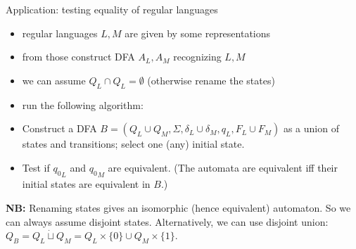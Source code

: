 \documentclass[handout]{beamer}
\begin{document}
\begin{frame}{Application: testing equality of regular languages}

    \begin{itemize}
        \item regular languages $L,M$ are given by some representations
        \item from those construct DFA $A_L,A_M$ recognizing $L,M$
        \item we can assume $Q_L\cap Q_L=\emptyset$ (otherwise rename the states)
        \item run the following algorithm:
    \end{itemize}
    
    \begin{algorithm}
        \begin{itemize}
            \item Construct a DFA \alert{$B=(Q_L\cup Q_M, \Sigma, \delta_L\cup \delta_M,q_L, F_L\cup F_M)$} as a union of states and transitions; select one (any) initial state.
            \item Test if ${q_{0}}_L$ and ${q_{0}}_M$ are equivalent.
            (The automata are equivalent iff their initial states are equivalent in $B$.)                
        \end{itemize}
    \end{algorithm}
        
    \textbf{NB:} Renaming states gives an isomorphic (hence equivalent) automaton. So we can always assume disjoint states. Alternatively, we can use disjoint union: $Q_B=Q_L\mathbin{\dot\sqcup} Q_M=Q_L\times\{0\}\cup Q_M\times\{1\}$.
    
\end{frame}
\end{document}
